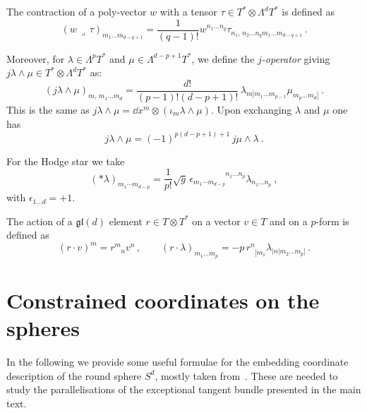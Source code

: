 \documentclass[debug]{phd}
\begin{document}
			The contraction of a poly-vector $w$ with a tensor $\tau \in T^*\otimes \Lambda^d T^*$ is defined as
					\begin{equation}
						(w\,\lrcorner\, \tau)_{m_1\ldots m_{d-q+1}} = \frac{1}{(q-1)!} w^{n_1\ldots n_q} \tau_{n_1,\,n_2\ldots n_q m_1\ldots m_{d-q+1}} \,.
					\end{equation}

			Moreover, for $\lambda \in \Lambda^{p}T^*$ and $\mu \in \Lambda^{d-p+1}T^*$, we define the \emph{$j$-operator} giving  $j \lambda \wedge \mu \in T^* \otimes \Lambda^d T^*$ as: 
					\begin{equation}\label{joper}
						\left(j \lambda \wedge \mu\right)_{m,\,m_1\ldots m_d} = \frac{d!}{(p-1)!(d-p+1)!}\,\lambda_{m[m_1\ldots m_{p-1}}\mu_{m_p\ldots m_d]}\ .
					\end{equation} 
			This is the same as $j\lambda \wedge \mu = \dd x^m \otimes (\iota_m \lambda \wedge \mu)$. Upon exchanging $\lambda$ and $\mu$ one has
					\begin{equation} 
						j \lambda \wedge \mu = (-1)^{p(d-p+1)+1}\, j\mu \wedge \lambda\ .
					\end{equation}

			For the Hodge star we take
					\begin{equation}
						(*\lambda)_{m_1\cdots m_{d-p}} = \frac{1}{p!}\sqrt{g}\,\epsilon_{m_1\cdots m_{d-p}}^{\phantom{m_1\cdots m_{d-p}} n_1\ldots n_p}\lambda_{n_1\ldots n_p} \ ,
					\end{equation}
			with $\epsilon_{1\ldots d} = +1$.

			The action of a $\mathfrak{gl}(d)$ element $r \in T \otimes T^*$ on a vector $v\in T $ and on a $p$-form is defined as
					\begin{equation}
						(r \cdot v)^m = r^{m}_{\phantom{m}n} v^n\,, \qquad (r\cdot \lambda)_{m_1\ldots m_p} = -p\, r^{n}_{\phantom{n}[m_1} \lambda_{|n| m_2\ldots m_p]}  \,. 
					\end{equation}
			\section{Constrained coordinates on the spheres}\label{app:constrcoo}
				In the following we provide some useful formulae for the embedding coordinate description of the round sphere $S^d$, mostly taken from~\cite{spheres}. 
				These are needed to study the parallelisations of the exceptional tangent bundle presented in the main text.
\end{document}
